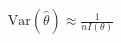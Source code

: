 \documentclass[preview]{standalone}
\begin{document}
\begin{align*}
\text{Var}(\hat{\theta}) \approx \frac{1}{nI(\theta)}
\end{align*}
\end{document}
